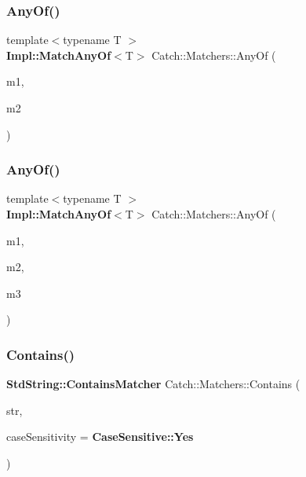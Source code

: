 \mbox{\label{namespace_catch_1_1_matchers_a07f8680aede448d54661b9ebc111ecad}} 
\subsubsection{Any\+Of()\hspace{0.1cm}{\footnotesize\ttfamily [1/2]}}
{\footnotesize\ttfamily template$<$typename T $>$ \\
\textbf{ Impl\+::\+Match\+Any\+Of}$<$T$>$ Catch\+::\+Matchers\+::\+Any\+Of (\begin{DoxyParamCaption}\item[{\textbf{ Impl\+::\+Matcher\+Base}$<$ T $>$ const \&}]{m1,  }\item[{\textbf{ Impl\+::\+Matcher\+Base}$<$ T $>$ const \&}]{m2 }\end{DoxyParamCaption})\hspace{0.3cm}{\ttfamily [inline]}}

\mbox{\label{namespace_catch_1_1_matchers_a37055a4e76b2aa356b17a508a806a445}} 
\subsubsection{Any\+Of()\hspace{0.1cm}{\footnotesize\ttfamily [2/2]}}
{\footnotesize\ttfamily template$<$typename T $>$ \\
\textbf{ Impl\+::\+Match\+Any\+Of}$<$T$>$ Catch\+::\+Matchers\+::\+Any\+Of (\begin{DoxyParamCaption}\item[{\textbf{ Impl\+::\+Matcher\+Base}$<$ T $>$ const \&}]{m1,  }\item[{\textbf{ Impl\+::\+Matcher\+Base}$<$ T $>$ const \&}]{m2,  }\item[{\textbf{ Impl\+::\+Matcher\+Base}$<$ T $>$ const \&}]{m3 }\end{DoxyParamCaption})\hspace{0.3cm}{\ttfamily [inline]}}

\mbox{\label{namespace_catch_1_1_matchers_a1f6c2accdc6cd75a84d7112dcad647b4}} 
\subsubsection{Contains()\hspace{0.1cm}{\footnotesize\ttfamily [1/2]}}
{\footnotesize\ttfamily \textbf{ Std\+String\+::\+Contains\+Matcher} Catch\+::\+Matchers\+::\+Contains (\begin{DoxyParamCaption}\item[{std\+::string const \&}]{str,  }\item[{\textbf{ Case\+Sensitive\+::\+Choice}}]{case\+Sensitivity = {\ttfamily \textbf{ Case\+Sensitive\+::\+Yes}} }\end{DoxyParamCaption})}

